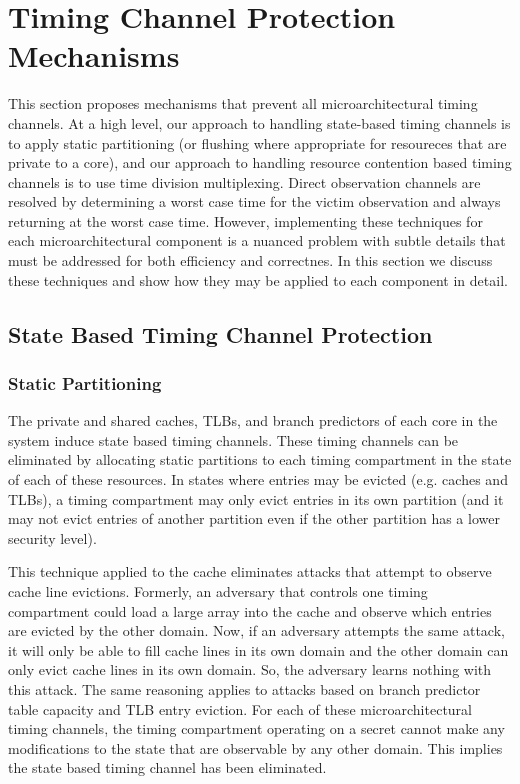 \section{Timing Channel Protection Mechanisms}
This section proposes mechanisms that prevent all microarchitectural timing 
channels. At a high level, our approach to handling state-based timing channels 
is to apply static partitioning (or flushing where appropriate for resoureces 
that are private to a core), and our approach to handling resource contention 
based timing channels is to use time division multiplexing. Direct observation
channels are resolved by determining a worst case time for the victim 
observation and always returning at the worst case time. However, implementing 
these techniques for each microarchitectural component is a nuanced problem 
with subtle details that must be addressed for both efficiency and correctnes. 
In this section we discuss these techniques and show how they may be applied to 
each component in detail.

\subsection{State Based Timing Channel Protection}
\subsubsection{Static Partitioning}
The private and shared caches, TLBs, and branch predictors of each core in the 
system induce state based timing channels.  These timing channels can be 
eliminated by allocating static partitions to each timing compartment in the 
state of each of these resources. In states where entries may be evicted (e.g. 
caches and TLBs), a timing compartment may only evict entries in its own 
partition (and it may not evict entries of another partition even if the other 
partition has a lower security level).

This technique applied to the cache eliminates attacks that attempt to observe 
cache line evictions. Formerly, an adversary that controls one timing 
compartment could load a large array into the cache and observe which entries 
are evicted by the other domain. Now, if an adversary attempts the same attack, 
it will only be able to fill cache lines in its own domain and the other domain 
can only evict cache lines in its own domain. So, the adversary learns nothing 
with this attack. The same reasoning applies to attacks based on branch 
predictor table capacity and TLB entry eviction. For each of these 
microarchitectural timing channels, the timing compartment operating on a 
secret cannot make any modifications to the state that are observable by any 
other domain. This implies the state based timing channel has been eliminated.


